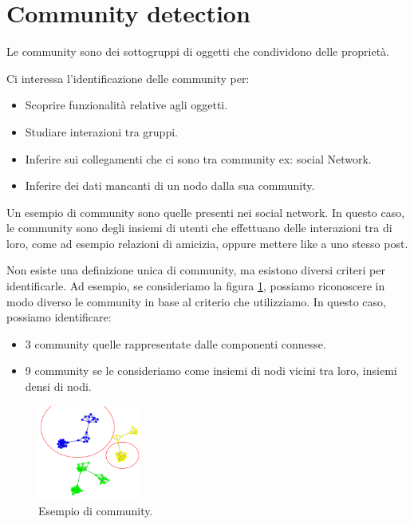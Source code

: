 \section{Community detection}
\begin{definizione}
    Le community sono dei sottogruppi di oggetti che condividono delle proprietà.
\end{definizione}
Ci interessa l'identificazione delle community per:
\begin{itemize}
    \item Scoprire funzionalità relative agli oggetti.
    \item Studiare interazioni tra gruppi.
    \item Inferire sui collegamenti che ci sono tra community ex: social Network.
    \item Inferire dei dati mancanti di un nodo dalla sua community.
\end{itemize}
\begin{esempio}
    Un esempio di community sono quelle presenti nei social network. In questo caso,
    le community sono degli insiemi di utenti che effettuano delle interazioni
    tra di loro, come ad esempio relazioni di amicizia, oppure mettere like a
    uno stesso post.
\end{esempio}
Non esiste una definizione unica di community, ma esistono diversi criteri per
identificarle. Ad esempio, se consideriamo la figura \ref{fig:community}, possiamo
riconoscere in modo diverso le community in base al criterio che utilizziamo.
In questo caso, possiamo identificare:
\begin{itemize}
    \item 3 community quelle rappresentate dalle componenti connesse.
    \item 9 community se le consideriamo come insiemi di nodi vicini tra loro,
          insiemi densi di nodi.
\end{itemize}
\begin{figure}[!ht]
    \centering
    \includegraphics[width=0.3\textwidth]{./img/net/community.png}
    \caption{Esempio di community.}
    \label{fig:community}
\end{figure}

